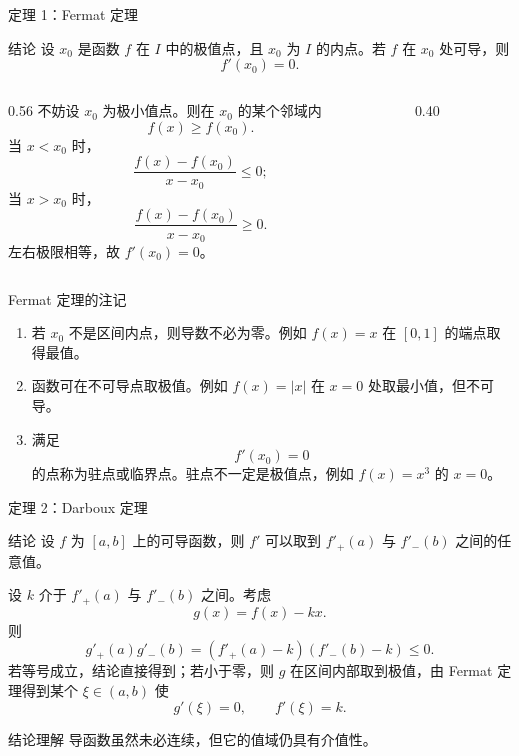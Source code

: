 \documentclass[aspectratio=169,10pt]{ctexbeamer}
\begin{document}
\begin{frame}[t]{定理 1：Fermat 定理}
\small
\begin{block}{结论}
设 $x_0$ 是函数 $f$ 在 $I$ 中的极值点，且 $x_0$ 为 $I$ 的内点。若 $f$ 在 $x_0$ 处可导，则
\[
  f'(x_0)=0.
\]
\end{block}

\begin{columns}[T,onlytextwidth]
\begin{column}{0.56\textwidth}
不妨设 $x_0$ 为极小值点。则在 $x_0$ 的某个邻域内
\[
  f(x)\ge f(x_0).
\]
当 $x<x_0$ 时，
\[
  \frac{f(x)-f(x_0)}{x-x_0}\le0;
\]
当 $x>x_0$ 时，
\[
  \frac{f(x)-f(x_0)}{x-x_0}\ge0.
\]
左右极限相等，故 $f'(x_0)=0$。
\end{column}
\begin{column}{0.40\textwidth}
\begin{center}
\end{center}
\end{column}
\end{columns}
\end{frame}

\begin{frame}[t]{Fermat 定理的注记}
\small
\begin{enumerate}
  \item 若 $x_0$ 不是区间内点，则导数不必为零。例如 $f(x)=x$ 在 $[0,1]$ 的端点取得最值。
  \item 函数可在不可导点取极值。例如 $f(x)=|x|$ 在 $x=0$ 处取最小值，但不可导。
  \item 满足
  \[
    f'(x_0)=0
  \]
  的点称为驻点或临界点。驻点不一定是极值点，例如 $f(x)=x^3$ 的 $x=0$。
\end{enumerate}
\end{frame}

\begin{frame}[t]{定理 2：Darboux 定理}
\small
\begin{block}{结论}
设 $f$ 为 $[a,b]$ 上的可导函数，则 $f'$ 可以取到 $f'_+(a)$ 与 $f'_-(b)$ 之间的任意值。
\end{block}

设 $k$ 介于 $f'_+(a)$ 与 $f'_-(b)$ 之间。考虑
\[
  g(x)=f(x)-kx.
\]
则
\[
  g'_+(a)g'_-(b)=(f'_+(a)-k)(f'_-(b)-k)\le0.
\]
若等号成立，结论直接得到；若小于零，则 $g$ 在区间内部取到极值，由 Fermat 定理得到某个 $\xi\in(a,b)$ 使
\[
  g'(\xi)=0,\qquad f'(\xi)=k.
\]
\begin{alertblock}{结论理解}
导函数虽然未必连续，但它的值域仍具有介值性。
\end{alertblock}
\end{frame}
\end{document}
